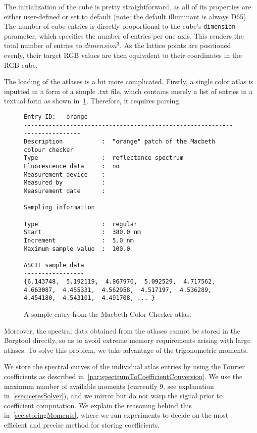 The initialization of the cube is pretty straightforward, as all of its properties are either user-defined or set to default (note: the default illuminant is always D65). The number of cube entries is directly proportional to the cube's \texttt{dimension} parameter, which specifies the number of entries per one axis. This renders the total number of entries to $dimension^3$. As the lattice points are positioned evenly, their target RGB values are then equivalent to their coordinates in the RGB cube.

The loading of the atlases is a bit more complicated. Firstly, a single color atlas is inputted in a form of a simple .txt file, which contains merely a list of entries in a textual form as shown in~\cref{fig:macbethSampleText}. Therefore, it requires parsing.

\begin{figure}[t]
	\begin{lstlisting}
Entry ID:   orange
---------------------------------------------------------------------------
Description           :  "orange" patch of the Macbeth colour checker
Type                  :  reflectance spectrum
Fluorescence data     :  no
Measurement device    :  
Measured by           :  
Measurement date      :  

Sampling information
--------------------
Type	    	      :  regular
Start                 :  380.0 nm
Increment             :  5.0 nm
Maximum sample value  :  100.0

ASCII sample data
-----------------
{6.143748,  5.192119,  4.867970,  5.092529,  4.717562,  4.663087,  4.455331,  4.562958,  4.517197,  4.536289,  4.454180,  4.543101,  4.491708, ... }

	\end{lstlisting}
	\caption{A sample entry from the Macbeth Color Checker atlas.}
	\label{fig:macbethSampleText}
\end{figure}

Moreover, the spectral data obtained from the atlases cannot be stored in the Borgtool directly, so as to avoid extreme memory requirements arising with large atlases. To solve this problem, we take advantage of the trigonometric moments.

We store the spectral curves of the individual atlas entries by using the Fourier coefficients as described in~\cref{par:spectrumToCoefficientConversion}. We use the maximum number of available moments (currently 9, see explanation in~\cref{ssec:ceresSolver}), and we mirror but do not warp the signal prior to coefficient computation. We explain the reasoning behind this in~\cref{sec:storingMoments}, where we run experiments to decide on the most efficient and precise method for storing coefficients.

